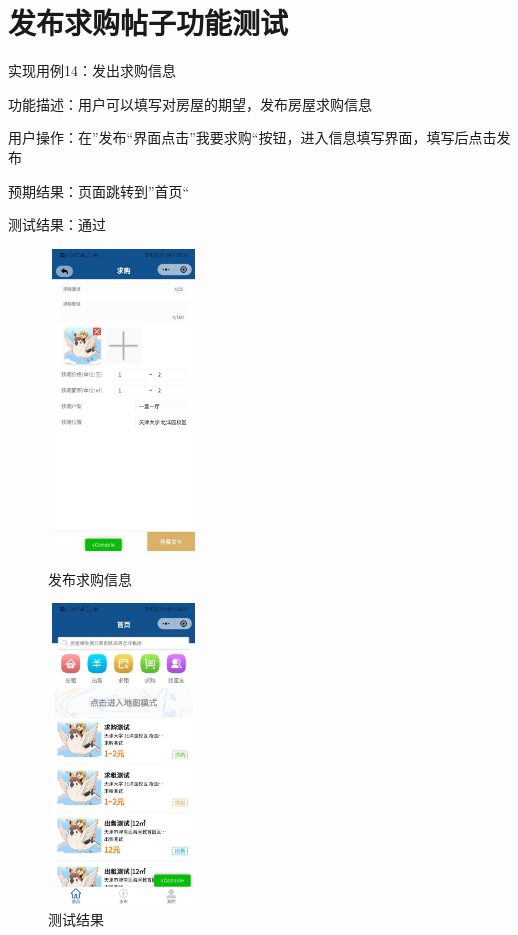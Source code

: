    \section{发布求购帖子功能测试}

实现用例14：发出求购信息

功能描述：用户可以填写对房屋的期望，发布房屋求购信息

用户操作：在”发布“界面点击”我要求购“按钮，进入信息填写界面，填写后点击发布

预期结果：页面跳转到”首页“

测试结果：通过
\begin{figure}[htbp]
    \centering
    \begin{minipage}[t]{0.48\textwidth}
    \centering
    \includegraphics[width=4cm,height=8cm]{test/image/test32.png} 
 
   \caption{发布求购信息} 
    \end{minipage}
    \begin{minipage}[t]{0.48\textwidth}
    \centering
    \includegraphics[width=4cm,height=8cm]{test/image/test33.png}
    \caption{测试结果}
    \end{minipage}
    \end{figure} 


